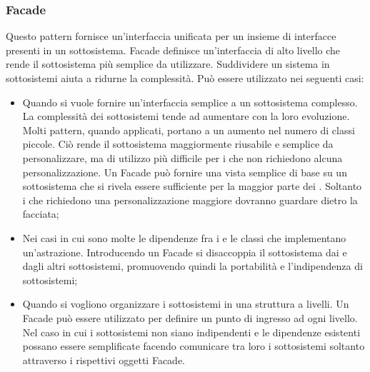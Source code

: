 \documentclass[12pt,a4paper]{article}
\begin{document}
\subsubsection{Facade}
Questo pattern fornisce un’interfaccia unificata per un insieme di interfacce presenti in un sottosistema. Facade definisce un’interfaccia di alto livello che rende il sottosistema più semplice da utilizzare. Suddividere un sistema in sottosistemi aiuta a ridurne la complessità. Può essere utilizzato nei seguenti casi:
\begin{itemize}
	\item Quando si vuole fornire un’interfaccia semplice a un sottosistema complesso. La complessità dei sottosistemi tende ad aumentare con la loro evoluzione. Molti pattern, quando applicati, portano a un aumento nel numero di classi piccole. Ciò rende il sottosistema maggiormente riusabile e semplice da personalizzare, ma di utilizzo più difficile per i  che non richiedono alcuna personalizzazione. Un Facade può fornire una vista semplice di base su un sottosistema che si rivela essere sufficiente per la maggior parte dei . Soltanto i  che richiedono una personalizzazione maggiore dovranno guardare dietro la facciata;
	\item Nei casi in cui sono molte le dipendenze fra i  e le classi che implementano un’astrazione. Introducendo un Facade si disaccoppia il sottosistema dai  e dagli altri sottosistemi, promuovendo quindi la portabilità e l’indipendenza di sottosistemi;
	\item Quando si vogliono organizzare i sottosistemi in una struttura a livelli. Un Facade può essere utilizzato per definire un punto di ingresso ad ogni livello. Nel caso in cui i sottosistemi non siano indipendenti e le dipendenze esistenti possano essere semplificate facendo comunicare tra loro i sottosistemi soltanto attraverso i rispettivi oggetti Facade.
\end{itemize}
\end{document}
